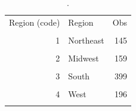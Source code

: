 \begin{table}[htbp]\centering
\caption{.}
\label{tab:trust_region_groups_2020_with_empty}
\begin{tabular}{rlr}\toprule
Region (code) & Region & Obs \\\\ \midrule
1 & Northeast & 145 \\\\
2 & Midwest & 159 \\\\
3 & South & 399 \\\\
4 & West & 196 \\\\
\bottomrule\end{tabular}\end{table}
